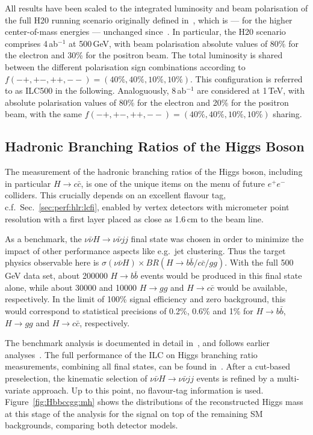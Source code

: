 All results have been scaled to the integrated luminosity and beam polarisation of the full H20 running scenario originally defined in~\cite{Barklow:2015tja}, which is --- for the higher center-of-mass energies --- unchanged since~\cite{Bambade:2019fyw}. In particular, the H20 scenario comprises 4\,ab$^{-1}$ at 500\,GeV, with beam polarisation absolute values of 80\% for the electron and 30\% for the positron beam. The total luminosity is shared between the different polarisation sign combinations according to $f(-+,+-,++,--) = (40\%,40\%, 10\%, 10\%)$. This configuration is referred to as ILC500 in the following.
Analoguously, 8\,ab$^{-1}$ are considered at 1\,TeV, with absolute polarisation values of 80\% for the electron and 20\% for the positron beam, with the same $f(-+,+-,++,--) = (40\%,40\%, 10\%, 10\%)$ sharing.

\subsection{Hadronic Branching Ratios of the Higgs Boson}

The measurement of the hadronic branching ratios of the Higgs boson,
including in particular $H\to c\bar{c}$, is one of the unique items
on the menu of future $e^+e^-$ colliders. This crucially depends on 
an excellent flavour tag, c.f.\ Sec.~\ref{sec:perf:hlr:lcfi}, enabled
by vertex detectors with micrometer point resolution with a first layer placed as close as 1.6\,cm to the beam line.

As a benchmark, the $\nu \bar{\nu} H \to \nu \bar{\nu} jj$ final state was chosen in order to minimize the impact of other performance aspects like e.g.\ jet clustering. Thus the target physics observable here is $\sigma(\nu\bar{\nu} H)\times BR(H\to b\bar{b} / c\bar{c} / gg)$. With the full 500\,GeV data set, about 200000 $H \to b\bar{b}$ events would be produced in this final state alone, while about 30000 and 10000 $H \to gg$ and $H \to c\bar{c}$ would be available, respectively. In the 
limit of 100\% signal efficiency and zero background, this would correspond to statistical precisions of 0.2\%, 0.6\% and 1\% for $H \to b\bar{b}$, $H \to gg$ and $H \to c\bar{c}$, respectively.

The benchmark analysis is documented in detail in~\cite{ILDNote:Hbbccgg}, and follows earlier analyses~\cite{Mueller:2016exq,Ono:2013voc,Ono:2013sea}. The full performance of the ILC on Higgs branching ratio measurements, combining all final states,  can be found in~\cite{Bambade:2019fyw}. After a cut-based preselection, the kinematic selection of $\nu \bar{\nu} H \to \nu \bar{\nu} jj$ events is refined by a multi-variate approach. Up to this point, no flavour-tag information is used.
Figure~\ref{fig:Hbbccgg:mh} shows the distributions of the reconstructed Higgs mass at this stage of the analysis for the signal on top of the remaining SM backgrounds, comparing both detector models.

